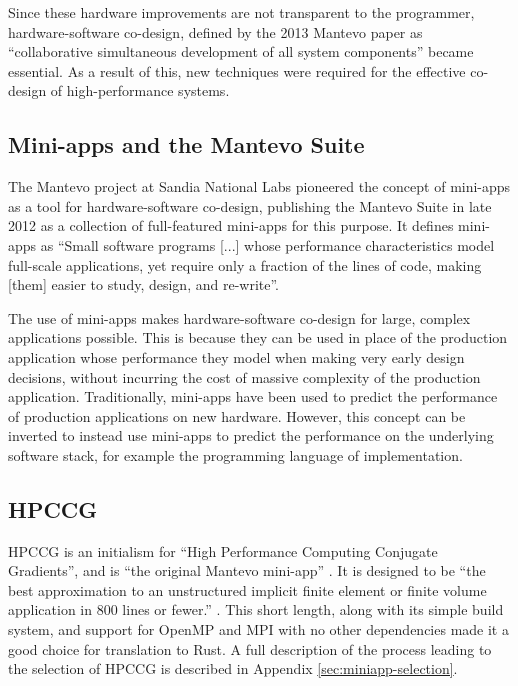 
Since these hardware improvements are not transparent to the programmer, hardware-software co-design, defined by the 2013 Mantevo paper as ``collaborative simultaneous development of all system components'' \cite{heroux2013mantevo} became essential. As a result of this, new techniques were required for the effective co-design of high-performance systems.

\subsection{Mini-apps and the Mantevo Suite}
\label{ssec:miniapps-mantevo} %

The Mantevo project at Sandia National Labs pioneered the concept of mini-apps as a tool for hardware-software co-design, publishing the Mantevo Suite in late 2012 as a collection of full-featured mini-apps for this purpose. It defines mini-apps as ``Small software programs [...] whose performance characteristics model full-scale applications, yet require only a fraction of the lines of code, making [them] easier to study, design, and re-write''.

The use of mini-apps makes hardware-software co-design for large, complex applications possible. This is because they can be used in place of the production application whose performance they model when making very early design decisions, without incurring the cost of massive complexity of the production application. Traditionally, mini-apps have been used to predict the performance of production applications on new hardware. However, this concept can be inverted to instead use mini-apps to predict the performance on the underlying software stack, for example the programming language of implementation.


\subsection{HPCCG}
\label{ssec:hpccg} %

HPCCG is an initialism for ``High Performance Computing Conjugate Gradients'', and is ``the original Mantevo mini-app'' \cite{herouxHPCCGSolverPackage2007}. It is designed to be ``the best approximation to an unstructured implicit finite element or finite volume application in 800 lines or fewer.'' \cite{PackagesMantevo}. This short length, along with its simple build system, and support for OpenMP and MPI with no other dependencies made it a good choice for translation to Rust. A full description of the process leading to the selection of HPCCG is described in Appendix \ref{sec:miniapp-selection}.

